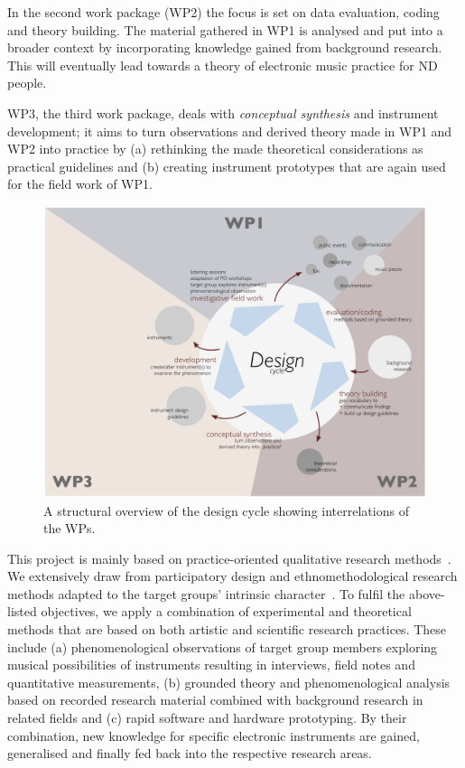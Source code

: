 \documentclass{chi-ext}
\begin{document}
\begin{multicols}{2}
In the second work package (WP2) the focus is set on data evaluation, coding and theory building.
The material gathered in WP1 is analysed and put into a broader context by incorporating knowledge gained from background research.
This will eventually lead towards a theory of electronic music practice for ND people.

WP3, the third work package, deals with \emph{conceptual synthesis} and instrument development; it aims to turn observations and derived theory made in WP1 and WP2 into practice by (a) rethinking the made theoretical considerations as practical guidelines and (b) creating instrument prototypes that are again used for the field work of WP1.

\begin{figure}
	\includegraphics[width=\columnwidth]{media/DEINDDesignCycle.pdf}
	\caption{A structural overview of the design cycle showing interrelations of the WPs.}
	\label{fig:Designcycle}
\end{figure}

This project is mainly based on practice-oriented qualitative research methods~\cite{travers2001-qua}.
We extensively draw from participatory design and ethnomethodological research methods adapted to the target groups’ intrinsic character~\cite{schuler1993-par,strauss1990-bas}.
To fulfil the above-listed objectives, we apply a combination of experimental and theoretical methods that are based on both artistic and scientific research practices. 
These include 
(a) phenomenological observations of target group members exploring musical possibilities of instruments resulting in interviews, field notes and quantitative measurements, 
(b) grounded theory and phenomenological analysis based on recorded research material combined with background research in related fields and
(c) rapid software and hardware prototyping.
By their combination, new knowledge for specific electronic instruments are gained, generalised and finally fed back into the respective research areas.


\end{multicols}
\end{document}
